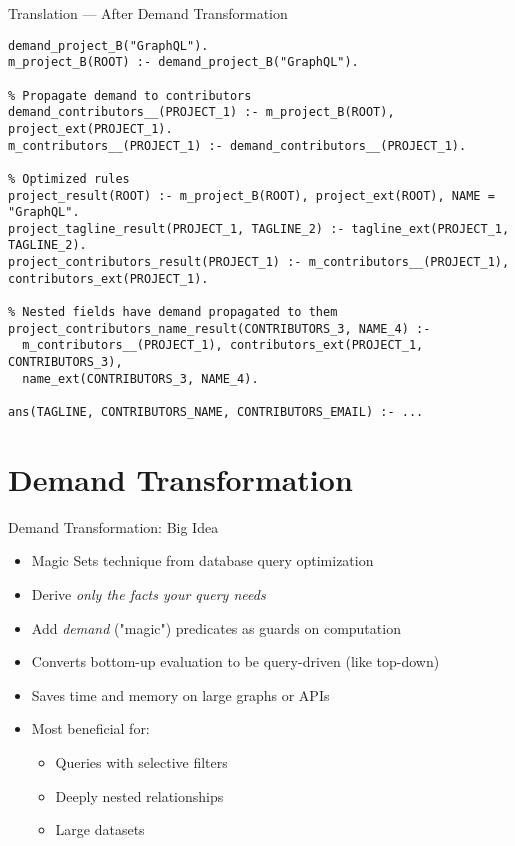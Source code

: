 \documentclass{beamer}
\begin{document}
\begin{frame}[fragile]{Translation — After Demand Transformation}
\begin{lstlisting}[basicstyle=\scriptsize\ttfamily]
% Demand transformation facts & rules
demand_project_B("GraphQL").
m_project_B(ROOT) :- demand_project_B("GraphQL").

% Propagate demand to contributors
demand_contributors__(PROJECT_1) :- m_project_B(ROOT), project_ext(PROJECT_1).
m_contributors__(PROJECT_1) :- demand_contributors__(PROJECT_1).

% Optimized rules
project_result(ROOT) :- m_project_B(ROOT), project_ext(ROOT), NAME = "GraphQL".
project_tagline_result(PROJECT_1, TAGLINE_2) :- tagline_ext(PROJECT_1, TAGLINE_2).
project_contributors_result(PROJECT_1) :- m_contributors__(PROJECT_1), contributors_ext(PROJECT_1).

% Nested fields have demand propagated to them
project_contributors_name_result(CONTRIBUTORS_3, NAME_4) :- 
  m_contributors__(PROJECT_1), contributors_ext(PROJECT_1, CONTRIBUTORS_3), 
  name_ext(CONTRIBUTORS_3, NAME_4).

ans(TAGLINE, CONTRIBUTORS_NAME, CONTRIBUTORS_EMAIL) :- ...
\end{lstlisting}
\end{frame}

\section{Demand Transformation}
\begin{frame}{Demand Transformation: Big Idea}
  \begin{itemize}
    \item Magic Sets technique from database query optimization
    \item Derive \emph{only the facts your query needs}
    \item Add \textit{demand} ("magic") predicates as guards on computation
    \item Converts bottom-up evaluation to be query-driven (like top-down)
    \item Saves time and memory on large graphs or APIs
    \item Most beneficial for:
      \begin{itemize}
        \item Queries with selective filters
        \item Deeply nested relationships
        \item Large datasets
      \end{itemize}
  \end{itemize}
\end{frame}
\end{document}
